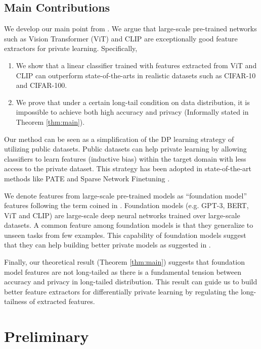 \documentclass{article}
\theoremstyle{definition}
\begin{document}
\subsection{Main Contributions}
\label{subsec:maincont}
We develop our main point from \cite{tramer2020differentially}. We argue that large-scale pre-trained networks such as Vision Transformer (ViT) \cite{dosovitskiy2020image} and CLIP \cite{radford2021learning} are exceptionally good feature extractors for private learning. Specifically,
\begin{enumerate}
    \item We show that a linear classifier trained with features extracted from ViT and CLIP can outperform state-of-the-arts in realistic datasets such as CIFAR-10 and CIFAR-100.
    \item We prove that under a certain long-tail condition on data distribution, it is impossible to achieve both high accuracy and privacy (Informally stated in Theorem \ref{thm:main}).
\end{enumerate}

Our method can be seen as a simplification of the DP learning strategy of utilizing public datasets. Public datasets can help private learning by allowing classifiers to learn features (inductive bias) within the target domain with less access to the private dataset. This strategy has been adopted in state-of-the-art methods like PATE \cite{papernot2018scalable} and Sparse Network Finetuning \cite{luo2021scalable}. 

We denote features from large-scale pre-trained models as ``foundation model'' features following the term coined in \cite{bommasani2021opportunities}. Foundation models (e.g. GPT-3, BERT, ViT and CLIP) are large-scale deep neural networks trained over large-scale datasets. A common feature among foundation models is that they generalize to unseen tasks from few examples. This capability of foundation models suggest that they can help building better private models as suggested in \cite{bommasani2021opportunities}.

Finally, our theoretical result (Theorem \ref{thm:main}) suggests that foundation model features are not long-tailed as there is a fundamental tension between accuracy and privacy in long-tailed distribution. This result can guide us to build better feature extractors for differentially private learning by regulating the long-tailness of extracted features.

\section{Preliminary}
\label{sec:prelim}
\end{document}
